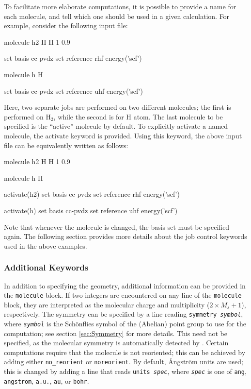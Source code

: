 To facilitate more elaborate computations, it is possible to provide a name for
each molecule, and tell \PSIfour which one should be used in a given
calculation. For example, consider the following input file:
\begin{Snippet}
molecule h2{
  H
  H 1 0.9
}


set basis cc-pvdz
set reference rhf
energy('scf')

molecule h{
  H
}

set basis cc-pvdz
set reference uhf
energy('scf')
\end{Snippet}
Here, two separate jobs are performed on two different molecules; the first is
performed on H$_2$, while the second is for H atom. The last molecule to be
specified is the ``active'' molecule by default. To explicitly activate a named
molecule, the activate keyword is provided. Using this keyword, the above input
file can be equivalently written as follows:
\begin{Snippet}
molecule h2{
  H
  H 1 0.9
}

molecule h{
  H
}

activate(h2)
set basis cc-pvdz
set reference rhf
energy('scf')

activate(h)
set basis cc-pvdz
set reference uhf
energy('scf')
\end{Snippet}
Note that whenever the molecule is changed, the basis set must be specified
again. The following section provides more details about the job control
keywords used in the above examples.

\subsubsection{Additional Keywords}\label{sec:MoleculeKeywords}

In addition to specifying the geometry, additional information can be provided
in the {\tt molecule} block. If two integers are encountered on any line of the
{\tt molecule} block, they are interpreted as the molecular charge and multiplicity
($2\times M_s + 1$), respectively.  The symmetry can be specified by a line reading
\texttt{symmetry \slshape symbol}, where \texttt{\slshape symbol} is
the Sch\"onflies symbol of the (Abelian) point group to use for the
computation; see section \ref{sec:Symmetry} for more details. This need not be
specified, as the molecular symmetry is automatically detected by \PSIfour.
Certain computations require that the molecule is not reoriented; this can be
achieved by adding either {\tt no\_reorient} or {\tt noreorient}. By default,
\AA ngstr\"om units are used; this is changed by adding a line that reads
\texttt{units \slshape spec}, where \texttt{\slshape spec} is one of {\tt ang},
{\tt angstrom}, {\tt a.u.}, {\tt au}, or {\tt bohr}.


